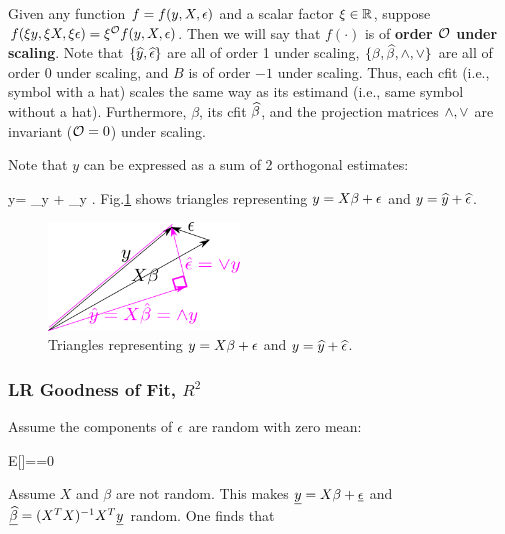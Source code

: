 Given any function $f=f(y,X,\epsilon)$
and a scalar factor $\xi\in { \mathbb{R}}$,
suppose
$f(\xi y, \xi X, \xi\epsilon)=\xi^{\cal O} f(y,X,\epsilon)$.
Then we will say that $f(\cdot)$
is of {\bf order ${\cal O}$ under scaling}.
Note that $\{\widehat{y},
 \widehat{\epsilon}\}$
are all of order 1 under scaling,
$\{\beta, \widehat{\beta}, \wedge, \vee\}$
are all of order 0 under scaling,
and $B$ is of order $-1$ under scaling.
Thus, each cfit (i.e., symbol
with a hat)
scales the same way as its estimand (i.e., same
symbol
without a hat). Furthermore,
$\beta$, its cfit $\widehat{\beta}$, and
the projection matrices $\wedge, \vee$
are invariant (${\cal O}=0$) under scaling.



Note that $y$
can be expressed as
a sum of 2 orthogonal estimates:



\beq
y= _{\A y} +
\underbrace{\HAT{\eps}}_{\V y}
\;.
\eeq
Fig.\ref{fig-lin-reg-vecs}
shows triangles representing
$y=X\beta+\epsilon$ and $y=\widehat{y}+\widehat{\epsilon}$.


\begin{figure}[h!]
\centering
\includegraphics[width=2in]
{conventions/lin-reg-vecs.png}
\caption{Triangles
representing
$y=X\beta+\epsilon$ and $y=\widehat{y}+\widehat{\epsilon}$.}
\label{fig-lin-reg-vecs}
\end{figure}

\subsubsection{LR Goodness of Fit, $R^2$}


Assume the components of $\epsilon$
are random with zero mean:

\beq
E[\rveps]=\av{\rveps}=0
\eeq



Assume $X$ and $\beta$ are not random.
This makes ${\underline{y}}=X\beta +\underline{\epsilon}$ and $\underline{\widehat{\beta}}=
(X^TX)^{-1}X^T{\underline{y}}
$
random.
One finds that

